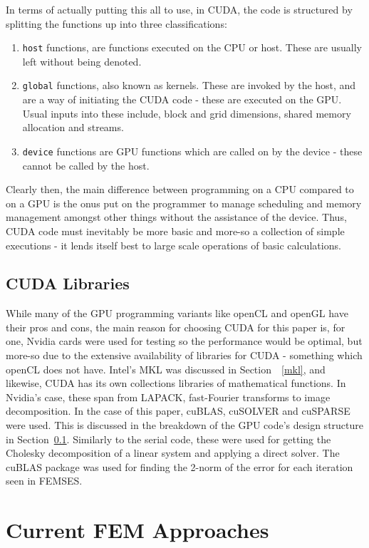 In terms of actually putting this all to use, in CUDA, the code is structured by splitting the functions up into three classifications:
\begin{enumerate}
	\item \texttt{\twound host\twound} functions, are functions executed on the CPU or host. These are usually left without being denoted.
	\item \texttt{\twound global\twound} functions, also known as kernels. These are invoked by the host, and are a way of initiating the CUDA code - these are executed on the GPU. Usual inputs into these include, block and grid dimensions, shared memory allocation and streams.
	\item \texttt{\twound device\twound} functions are GPU functions which are called on by the device - these cannot be called by the host.
\end{enumerate}
Clearly then, the main difference between programming on a CPU compared to on a GPU is the onus put on the programmer to manage scheduling and memory management amongst other things without the assistance of the device. Thus, CUDA code must inevitably be more basic and more-so a collection of simple executions - it lends itself best to large scale operations of basic calculations.

\subsection{CUDA Libraries}\label{culibs}

While many of the GPU programming variants like openCL and openGL have their pros and cons, the main reason for choosing CUDA for this paper is, for one, Nvidia cards were used for testing so the performance would be optimal, but more-so due to the extensive availability of libraries for CUDA - something which openCL does not have. Intel's MKL was discussed in Section~~\ref{mkl}, and likewise, CUDA has its own collections libraries of mathematical functions. In Nvidia's case, these span from LAPACK, fast-Fourier transforms to image decomposition. In the case of this paper, cuBLAS, cuSOLVER and cuSPARSE were used. This is discussed in the breakdown of the GPU code's design structure in Section~\ref{culibs}. Similarly to the serial code, these were used for getting the Cholesky decomposition of a linear system and applying a direct solver. The cuBLAS package was used for finding the 2-norm of the error for each iteration seen in FEMSES.

\section{Current FEM Approaches}\label{approaches}

